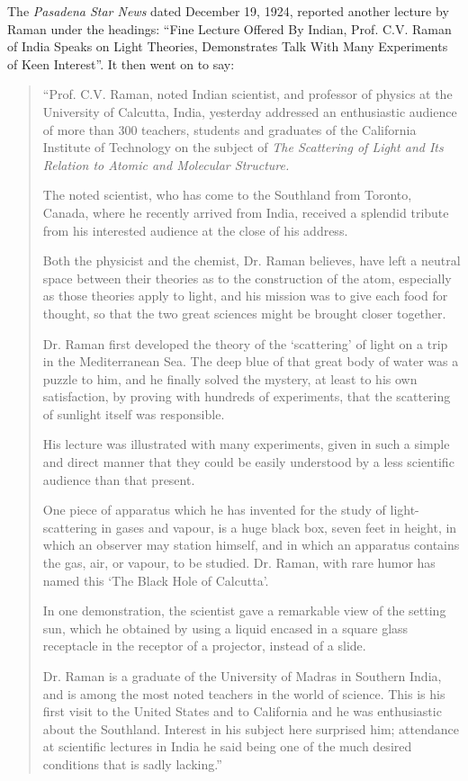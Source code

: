 The {\em Pasadena Star News} dated December 19, 1924, reported
another lecture by Raman under the headings: ``Fine Lecture
Offered By Indian, Prof. C.V. Raman of India Speaks on Light
Theories, Demonstrates Talk With Many Experiments of Keen
Interest''. It then went on to say:
\begin{quote}
{\fontsize{10pt}{11.5pt}\selectfont
``Prof. C.V. Raman, noted Indian scientist, and professor
of physics at the University of Calcutta, India, yesterday addressed
an enthusiastic audience of more than 300 teachers, students and
graduates of the California Institute of Technology on the subject
of {\em The Scattering of Light and Its Relation to Atomic and
Molecular Structure.}

The noted scientist, who has come to the Southland from
Toronto, Canada, where he recently arrived from India, received
a splendid tribute from his interested audience at the close of
his address.

Both the physicist and the chemist, Dr. Raman believes, have
left a neutral space between their theories as to the construction
of the atom, especially as those theories apply to light, and his
mission was to give each food for thought, so that the two great
sciences might be brought closer together.

Dr. Raman first developed the theory of the `scattering' of
light on a trip in the Mediterranean Sea. The deep blue of that
great body of water was a puzzle to him, and he finally solved
the mystery, at least to his own satisfaction, by proving with
hundreds of experiments, that the scattering of sunlight itself
was responsible.

His lecture was illustrated with many experiments, given in
such a simple and direct manner that they could be easily
understood by a less scientific audience than that present.

One piece of apparatus which he has invented for the study
of light-scattering in gases and vapour, is a huge black box, seven
feet in height, in which an observer may station himself, and in
which an apparatus contains the gas, air, or vapour, to be studied.
Dr. Raman, with rare humor has named this `The Black Hole
of Calcutta'.

In one demonstration, the scientist gave a remarkable view
of the setting sun, which he obtained by using a liquid encased
in a square glass receptacle in the receptor of a projector, instead
of a slide.

Dr. Raman is a graduate of the University of Madras in
Southern India, and is among the most noted teachers in the world
of science. This is his first visit to the United States and to
California and he was enthusiastic about the Southland. Interest
in his subject here surprised him; attendance at scientific lectures
in India he said being one of the much desired conditions that
is sadly lacking.''
}\relax
\end{quote}

